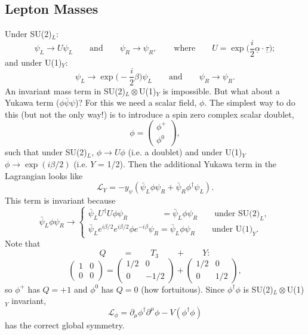\subsection{Lepton Masses}
%
Under SU(2)$_L$:
\begin{equation}
\psi_L \to U \psi_L \qquad \text{and} \qquad \psi_R \to \psi_R, \qquad \text{where} \qquad U=\exp\bigg(\frac{i}{2}\underline{\alpha}\cdot\underline{\tau}\bigg);
\end{equation}
and under U(1)$_Y$:
\begin{equation}
\psi_L \to \exp\bigg(-\frac{i}{2}\beta\bigg) \psi_L \qquad \text{and} \qquad \psi_R \to \psi_R.
\end{equation}
An invariant mass term in SU(2)$_L \otimes$U(1)$_Y$ is impossible. But what about a Yukawa term ($\phi \bar{\psi} \psi$)? For this we need a scalar field, $\phi$. The simplest way to do this (but not the only way!) is to introduce a spin zero complex scalar doublet,
\[\phi = \left( \begin{array}{cc}
\phi^+ \\
\phi^0
\end{array} \right), \]
such that under SU(2)$_L$, $\phi \to U \phi$ (i.e. a doublet) and under U(1)$_Y$ $\phi \to \exp(i \beta /2)$ (i.e. $Y$ = 1/2). Then the additional Yukawa term in the Lagrangian looks like
\begin{equation}
\mathcal{L}_Y = -y_\psi(\bar{\psi}_L \phi \psi_R + \bar{\psi}_R \phi^\dagger \psi_L).
\end{equation}
This term is invariant because 
\begin{equation}
\bar{\psi}_L \phi \psi_R \to
\begin{cases}
\bar{\psi}_L U^\dagger U \phi \psi_R \qquad \qquad= \bar{\psi}_L \phi \psi_R \qquad \text{under SU(2)}_L,\\
\bar{\psi}_L e^{i \beta/2} e^{i \beta/2} \phi e^{-i\beta} \psi_R =\bar{\psi}_L \phi \psi_R \qquad \text{under U(1)}_Y.
\end{cases}
\end{equation}
Note that
\[ Q \qquad = \qquad T_3 \qquad + \qquad Y: \]
\[\left( \begin{array}{cc}
1 & 0  \\
0 & 0  \end{array} \right)=
\left( \begin{array}{cc}
1/2 & 0  \\
0 & -1/2  \end{array} \right) +
\left( \begin{array}{cc}
1/2 & 0  \\
0 & 1/2  \end{array} \right), \]
so $\phi^+$ has $Q = +1$ and $\phi^0$ has $Q=0$ (how fortuitous). Since $\phi^\dagger \phi$ is SU(2)$_L \otimes$U(1)$_Y$ invariant,
\begin{equation}
\mathcal{L}_\phi = \partial_\mu \phi^\dagger \partial^\mu \phi - V(\phi^\dagger \phi)
\end{equation}
has the correct global symmetry.

